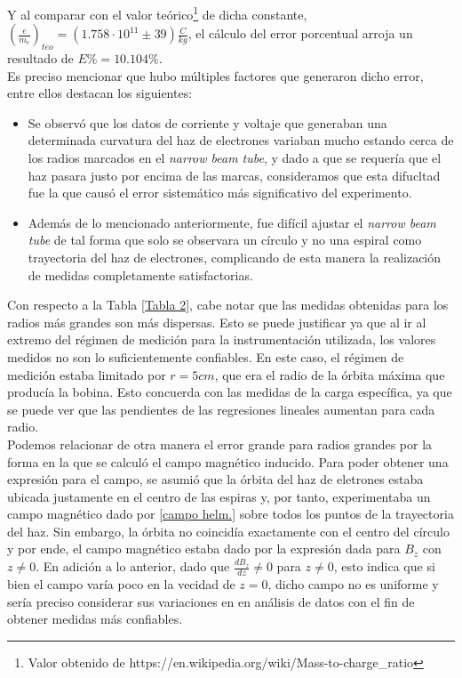 \documentclass[prb,aps,twocolumn,preprintnumbers,amsmath,amssymb]{revtex4}
\begin{document}
Y al comparar con el valor teórico\footnote{Valor obtenido de https://en.wikipedia.org/wiki/Mass-to-charge\_ratio} de dicha constante, $\left( \frac{e}{m_{e}} \right)_{teo} = (1.758 \cdot 10^{11}  \pm 39)  \frac{C}{kg}$, el cálculo del error porcentual arroja un resultado de $E\% = 10.104\%$.\\

Es preciso mencionar que hubo múltiples factores que generaron dicho error, entre ellos destacan los siguientes:

\begin{itemize}
	\item Se observó que los datos de corriente y voltaje que generaban una determinada curvatura del haz de electrones variaban mucho estando cerca de los radios marcados en el \textit{narrow beam tube}, y dado a que se requería que el haz pasara justo por encima de las marcas, consideramos que esta difucltad fue la que causó el error sistemático más significativo del experimento.
	
	\item Además de lo mencionado anteriormente, fue difícil ajustar el \textit{narrow beam tube} de tal forma que solo se observara un círculo y no una espiral como trayectoria del haz de electrones, complicando de esta manera la realización de medidas completamente satisfactorias.
\end{itemize}
	
Con respecto a la Tabla \ref{Tabla 2}, cabe notar que  las medidas obtenidas para los radios más grandes son más dispersas. Esto se puede justificar ya que al ir al extremo del régimen de medición para la instrumentación utilizada, los valores medidos no son lo suficientemente confiables. En este caso, el régimen de medición estaba limitado por $r = 5cm$, que era el radio de la órbita máxima que producía la bobina. Esto concuerda con las medidas de la carga específica, ya que se puede ver que las pendientes de las regresiones lineales aumentan para cada radio. \\

Podemos relacionar de otra manera el error grande para radios grandes por la forma en la que se calculó el campo magnético inducido. Para poder obtener una expresión para el campo, se asumió que la órbita del haz de eletrones estaba ubicada justamente en el centro de las espiras y, por tanto, experimentaba un campo magnético dado por \eqref{campo helm.} sobre todos los puntos de la trayectoria del haz. Sin embargo, la órbita no coincidía exactamente con el centro del círculo y por ende, el campo magnético estaba dado por la expresión dada para $B_{z}$ con $z \neq 0$. En adición a lo anterior, dado que $\frac{dB_{z}}{dz} \neq 0$ para $z \neq 0$, esto indica que si bien el campo varía poco en la vecidad de $z = 0$, dicho campo no es uniforme y sería preciso considerar sus variaciones en en análisis de datos con el fin de obtener medidas más confiables.\\  
\end{document}

